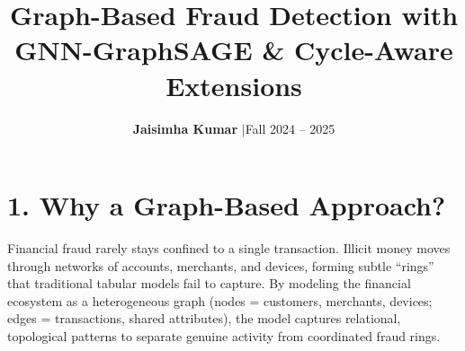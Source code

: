 \documentclass[10pt]{article}
\title{\vspace{-1.5em}\textbf{\Large Graph-Based Fraud Detection with GNN-GraphSAGE \& Cycle-Aware Extensions}\vspace{-0.5em}}
\author{\textbf{Jaisimha Kumar} \quad$|$\quad Fall 2024 -- 2025}
\date{\vspace{-1em}}
\begin{document}
\maketitle
\vspace{-1.5em}

\section*{1. Why a Graph-Based Approach?}
Financial fraud rarely stays confined to a single transaction. Illicit money moves through networks of accounts, merchants, and devices, forming subtle ``rings'' that traditional tabular models fail to capture. By modeling the financial ecosystem as a heterogeneous graph (nodes = customers, merchants, devices; edges = transactions, shared attributes), the model captures relational, topological patterns to separate genuine activity from coordinated fraud rings.
\end{document}

